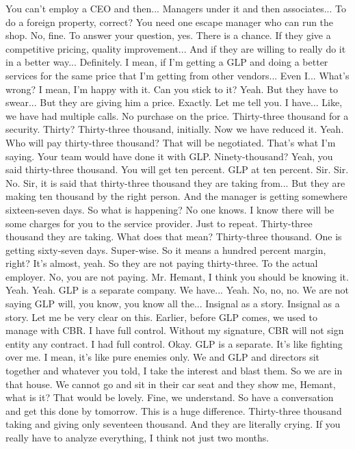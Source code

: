 You can't employ a CEO and then...
Managers under it and then associates...
To do a foreign property, correct?
You need one escape manager who can run the shop.
No, fine.
To answer your question, yes.
There is a chance.
If they give a competitive pricing, quality improvement...
And if they are willing to really do it in a better way...
Definitely.
I mean, if I'm getting a GLP and doing a better services for the same price that I'm getting from other vendors...
Even I...
What's wrong?
I mean, I'm happy with it.
Can you stick to it?
Yeah.
But they have to swear...
But they are giving him a price.
Exactly.
Let me tell you.
I have...
Like, we have had multiple calls.
No purchase on the price.
Thirty-three thousand for a security.
Thirty?
Thirty-three thousand, initially.
Now we have reduced it.
Yeah.
Who will pay thirty-three thousand?
That will be negotiated.
That's what I'm saying.
Your team would have done it with GLP.
Ninety-thousand?
Yeah, you said thirty-three thousand.
You will get ten percent.
GLP at ten percent.
Sir.
Sir.
No.
Sir, it is said that thirty-three thousand they are taking from...
But they are making ten thousand by the right person.
And the manager is getting somewhere sixteen-seven days.
So what is happening?
No one knows.
I know there will be some charges for you to the service provider.
Just to repeat.
Thirty-three thousand they are taking.
What does that mean?
Thirty-three thousand.
One is getting sixty-seven days.
Super-wise.
So it means a hundred percent margin, right?
It's almost, yeah.
So they are not paying thirty-three.
To the actual employer.
No, you are not paying.
Mr. Hemant, I think you should be knowing it.
Yeah.
Yeah.
GLP is a separate company.
We have...
Yeah.
No, no, no.
We are not saying GLP will, you know, you know all the...
Insignal as a story.
Insignal as a story.
Let me be very clear on this.
Earlier, before GLP comes, we used to manage with CBR.
I have full control.
Without my signature, CBR will not sign entity any contract.
I had full control.
Okay.
GLP is a separate.
It's like fighting over me.
I mean, it's like pure enemies only.
We and GLP and directors sit together and whatever you told,
I take the interest and blast them.
So we are in that house.
We cannot go and sit in their car seat and they show me,
Hemant, what is it?
That would be lovely.
Fine, we understand.
So have a conversation and get this done by tomorrow.
This is a huge difference.
Thirty-three thousand taking and giving only seventeen thousand.
And they are literally crying.
If you really have to analyze everything,
I think not just two months.
